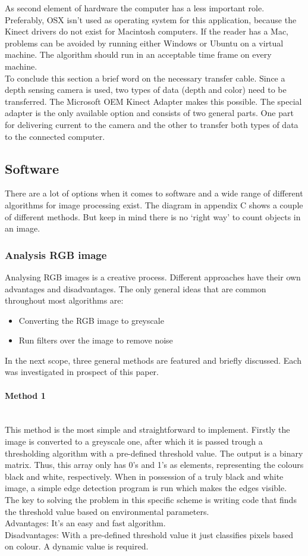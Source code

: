 \documentclass[11pt]{article}
\begin{document}
As second element of hardware the computer has a less important role. Preferably, OSX isn't used as operating system for this application, because the Kinect drivers do not exist for Macintosh computers. If the reader has a Mac, problems can be avoided by running either Windows or Ubuntu on a virtual machine. The algorithm should run in an acceptable time frame on every machine.\\
To conclude this section a brief word on the necessary transfer cable. Since a depth sensing camera is used, two types of data (depth and color) need to be transferred. The Microsoft OEM Kinect Adapter makes this possible. The special adapter is the only available option and consists of two general parts. One part for delivering current to the camera and the other to transfer both types of data to the connected computer.
\subsection{Software}
There are a lot of options when it comes to software and a wide range of different algorithms for image processing exist. The diagram in appendix C shows a couple of different methods. But keep in mind there is no ‘right way’ to count objects in an image.
\subsubsection{Analysis RGB image}
Analysing RGB images is a creative process. Different approaches have their own advantages and disadvantages. The only general ideas that are common throughout most algorithms are:
\begin{itemize}
\item Converting the RGB image to greyscale
\item Run filters over the image to remove noise
\end{itemize}
In the next scope, three general methods are featured and briefly discussed. Each was investigated in prospect of this paper.
\paragraph{Method 1}\mbox{}\\
This method is the most simple and straightforward to implement. Firstly the image is converted to a greyscale one, after which it is passed trough a thresholding algorithm with a pre-defined threshold value. The output is a binary matrix. Thus, this array only has 0's and 1's as elements, representing the colours black and white, respectively. When in possession of a truly black and white image, a simple edge detection program is run which makes the edges visible.\\
The key to solving the problem in this specific scheme is writing code that finds the threshold value based on environmental parameters. 
\\Advantages: It’s an easy and fast algorithm.
\\Disadvantages: With a pre-defined threshold value it just classifies pixels based on colour. A dynamic value is required.
\end{document}
